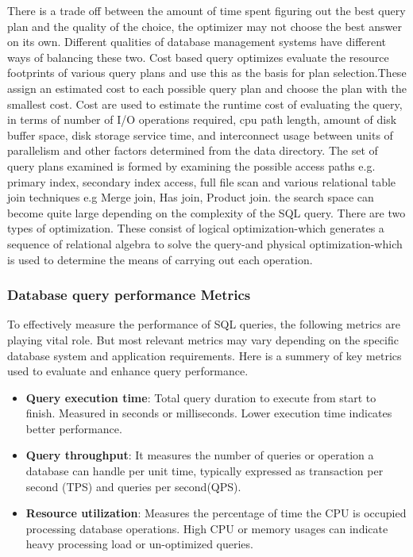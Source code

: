 There is a trade off between the amount of time spent figuring out the best query plan and the quality of the choice, the optimizer may not choose the best answer on its own. Different qualities of database management systems have different ways of balancing these two. Cost based query optimizes  evaluate the resource footprints of various query plans and use this as the basis for plan selection.These assign an estimated cost to each possible query plan and choose the plan with the smallest cost. Cost are used to estimate the runtime cost of evaluating the query, in terms of number of I/O operations required, cpu path length, amount of disk buffer space, disk storage service time, and interconnect usage between units of parallelism and other factors determined from the data directory. The set of query plans examined is formed by examining the possible access paths e.g. primary index, secondary index access, full file scan and various relational table join techniques e.g Merge join, Has join, Product join. the search space can become  quite large depending on the complexity of the SQL query. There are two types of optimization. These consist of logical optimization-which generates a sequence of relational algebra to solve the query-and physical optimization-which is used to determine the means of carrying out each operation.\cite{dremio-2024}


\subsubsection{Database query performance Metrics}
To effectively measure the performance of SQL queries, the following metrics are playing vital role. But most relevant metrics may vary depending on the specific database system and application requirements.
Here is a summery of key metrics used to evaluate and enhance query performance.\cite{chwesewicz-2024}
\begin{itemize}
    \item\textbf{Query execution time}: Total query duration to execute from start to finish. Measured in seconds or milliseconds. Lower execution time indicates better performance.
    \item\textbf{Query throughput}: It measures the number of queries or operation a database can handle per unit time, typically expressed as transaction per second (TPS) and queries per second(QPS).
    \item\textbf{Resource utilization}: Measures the percentage of time the CPU is occupied processing database operations. High CPU or memory usages can indicate heavy processing load or un-optimized queries.
\end{itemize}

